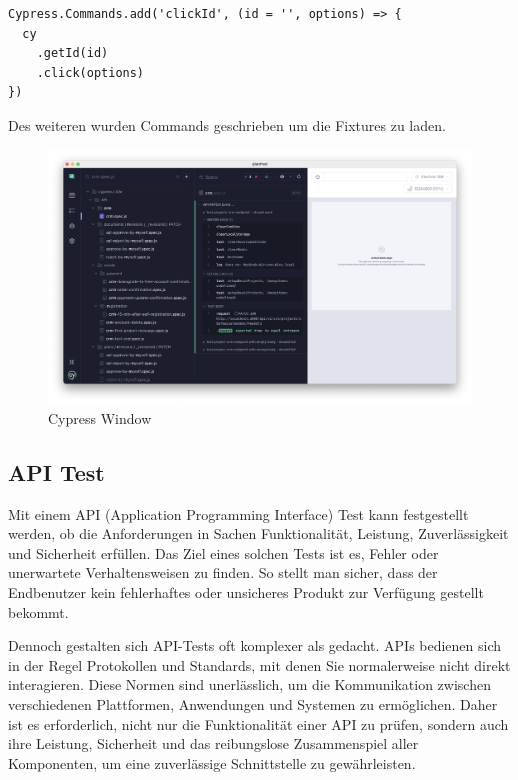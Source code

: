 \begin{lstlisting}
Cypress.Commands.add('clickId', (id = '', options) => {
  cy
    .getId(id)
    .click(options)
})
\end{lstlisting}

Des weiteren wurden Commands geschrieben um die Fixtures zu laden.

\begin{figure}[h!]
    \centering
    \includegraphics[width=1\linewidth]{pics/cypress-overview.png}
    \caption{Cypress Window}
    \label{fig:enter-label}
\end{figure}

\cite{Cypress}
\subsection{API Test}
Mit einem API (Application Programming Interface) Test kann festgestellt werden, ob die Anforderungen in Sachen Funktionalität, Leistung, Zuverlässigkeit und Sicherheit erfüllen. Das Ziel eines solchen Tests ist es, Fehler oder unerwartete Verhaltensweisen zu finden. So stellt man sicher, dass der Endbenutzer kein fehlerhaftes oder unsicheres Produkt zur Verfügung gestellt bekommt. 

Dennoch gestalten sich API-Tests oft komplexer als gedacht. APIs bedienen sich in der Regel Protokollen und Standards, mit denen Sie normalerweise nicht direkt interagieren. Diese Normen sind unerlässlich, um die Kommunikation zwischen verschiedenen Plattformen, Anwendungen und Systemen zu ermöglichen. Daher ist es erforderlich, nicht nur die Funktionalität einer API zu prüfen, sondern auch ihre Leistung, Sicherheit und das reibungslose Zusammenspiel aller Komponenten, um eine zuverlässige Schnittstelle zu gewährleisten.

